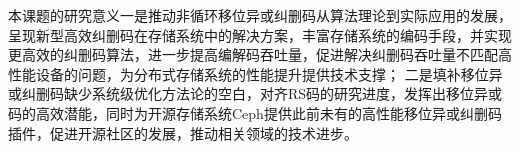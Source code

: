 本课题的研究意义一是推动非循环移位异或纠删码从算法理论到实际应用的发展，呈现新型高效纠删码在存储系统中的解决方案，丰富存储系统的编码手段，并实现更高效的纠删码算法，进一步提高编解码吞吐量，促进解决纠删码吞吐量不匹配高性能设备的问题\cite{weiCharacterizingOptimizingRemote2021}，为分布式存储系统的性能提升提供技术支撑；
二是填补移位异或纠删码缺少系统级优化方法论的空白，对齐RS码的研究进度，发挥出移位异或码的高效潜能，同时为开源存储系统Ceph提供此前未有的高性能移位异或纠删码插件，促进开源社区的发展，推动相关领域的技术进步。








